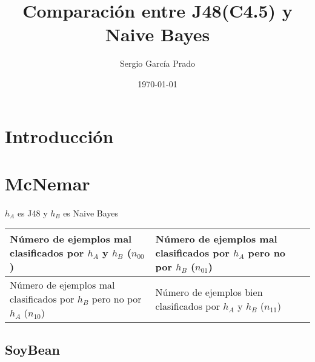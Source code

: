 \documentclass[10pt, a4paper,spanish]{article}
\title{\vspace{-15mm}\fontsize{24pt}{10pt}\selectfont\textbf{Comparación entre J48(C4.5) y Naive Bayes}} %
\author{Sergio García Prado}
\date{\today}
\begin{document}
	\maketitle %

	\thispagestyle{fancy} %


	\begin{abstract}
		\noindent
	\end{abstract}


	\section{Introducción}
        \paragraph{}


	\section{McNemar}

        \paragraph{}
		$h_A$ es J48 y  $h_B$ es Naive Bayes

		\center
		\begin{tabular}{ | p{6cm} | p{6cm} | }
			\hline
				Número de ejemplos mal clasificados por $h_A$  y $h_B$ ($n_{00}$) &
				Número de ejemplos mal clasificados por $h_A$  pero no por $h_B$ ($n_{01}$) \\ \hline

				Número de ejemplos mal clasificados por $h_B$ pero no por $h_A$ ($n_{10}$) &
				Número de ejemplos bien clasificados por $h_A$  y $h_B$ ($n_{11}$)\\
			\hline
		\end{tabular}


		\subsection{SoyBean}
\end{document}

